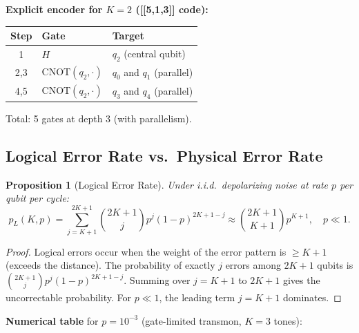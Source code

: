 \documentclass[11pt]{article}
\newtheorem{proposition}[theorem]{Proposition}
\theoremstyle{definition}
\theoremstyle{remark}
\begin{document}
\textbf{Explicit encoder for $K=2$ ([[5,1,3]] code):}

\begin{center}
\begin{tabular}{cll}
\toprule
Step & Gate & Target \\
\midrule
1 & $H$ & $q_2$ (central qubit) \\
2,3 & $\mathrm{CNOT}(q_2, \cdot)$ & $q_0$ and $q_1$ (parallel) \\
4,5 & $\mathrm{CNOT}(q_2, \cdot)$ & $q_3$ and $q_4$ (parallel) \\
\bottomrule
\end{tabular}
\end{center}

Total: 5 gates at depth 3 (with parallelism).

\subsection{Logical Error Rate vs.\ Physical Error Rate}

\begin{proposition}[Logical Error Rate]
\label{prop:logical-error}
Under i.i.d.\ depolarizing noise at rate $p$ per qubit per cycle:
\begin{equation}
  \boxed{
  p_L(K,p) = \sum_{j=K+1}^{2K+1}\binom{2K+1}{j}p^j(1-p)^{2K+1-j}
  \approx \binom{2K+1}{K+1}p^{K+1}, \quad p \ll 1.
  }\label{eq:logical-error-rate}
\end{equation}
\end{proposition}

\begin{proof}
Logical errors occur when the weight of the error pattern is $\geq K+1$
(exceeds the distance).  The probability of exactly $j$ errors among $2K+1$
qubits is $\binom{2K+1}{j}p^j(1-p)^{2K+1-j}$.  Summing over
$j = K+1$ to $2K+1$ gives the uncorrectable probability.  For $p\ll1$,
the leading term $j = K+1$ dominates.
\end{proof}

\textbf{Numerical table} for $p = 10^{-3}$ (gate-limited transmon, $K=3$ tones):
\end{document}
